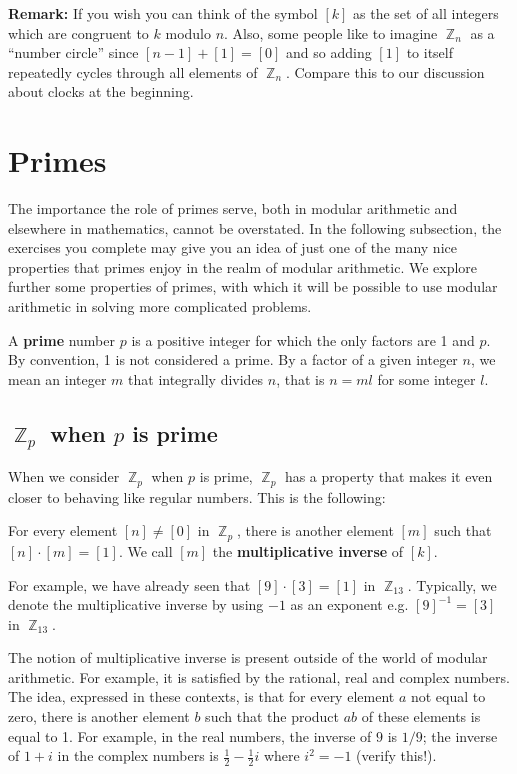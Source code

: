 \documentclass[12 pt]{article}
\DeclareMathOperator{\Z}{\mathbb{Z}}
\newcounter{exercise}[section]
\begin{document}
\textbf{Remark:}
If you wish you can think of the symbol $[k]$ as the set of all integers which are congruent to $k$ modulo $n$. Also, some people like to imagine $\Z_n$ as a ``number circle'' since $[n-1]+[1]=[0]$ and so adding $[1]$ to itself repeatedly cycles through all elements of $\Z_n$. Compare this to our discussion about clocks at the beginning.\\

\section{Primes}

The importance the role of primes serve, both in modular arithmetic and elsewhere in mathematics, cannot be overstated. In the following subsection, the exercises you complete may give you an idea of just one of the many nice properties that primes enjoy in the realm of modular arithmetic.  We explore further some properties of primes, with which it will be possible to use modular arithmetic in solving more complicated problems.


A \textbf{prime} number $p$ is a positive integer for which the only factors are 1 and $p$. By convention, 1 is not considered a prime.  By a factor of a given integer $n$, we mean an integer $m$ that integrally divides $n$, that is $n = ml$ for some integer $l$. 

\subsection{$\Z_p$ when $p$ is prime}
When we consider $\Z_p$ when $p$ is prime, $\Z_p$ has a property that makes it even closer to behaving like regular numbers. This is the following:
\begin{center}
For every element $[n]\not =[0]$ in $\Z_p$, there is another element $[m]$ such that $[n]\cdot [m]=[1]$. We call $[m]$ the \textbf{multiplicative inverse} of $[k]$.
\end{center}
For example, we have already seen that $[9]\cdot[3]=[1]$ in $\Z_{13}$. Typically, we denote the multiplicative inverse by using $-1$ as an exponent e.g. $[9]^{-1}=[3]$ in $\Z_{13}$. 

The notion of multiplicative inverse is present outside of the world of modular arithmetic. For example, it is satisfied by the rational, real and complex numbers. The idea, expressed in these contexts, is that for every element $a$ not equal to zero, there is another element $b$ such that the product $ab$ of these elements is equal to 1. For example, in the real numbers, the inverse of $9$ is $1/9$; the inverse of $1+i$ in the complex numbers is $\frac{1}{2}-\frac{1}{2}i$ where $i^2=-1$ (verify this!).
\end{document}

